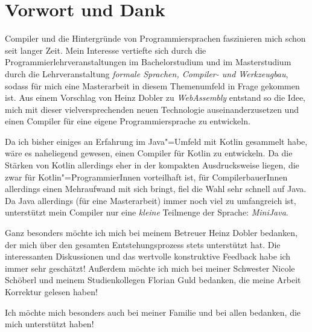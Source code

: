 \chapter{Vorwort und Dank}
 
Compiler und die Hintergründe von Programmiersprachen faszinieren mich schon seit langer Zeit. Mein Interesse vertiefte sich durch die Programmierlehrveranstaltungen im Bachelorstudium und im Masterstudium durch die Lehrveranstaltung \emph{formale Sprachen, Compiler- und Werkzeugbau}, sodass für mich eine Masterarbeit in diesem Themenumfeld in Frage gekommen ist. Aus einem Vorschlag von Heinz Dobler zu \emph{WebAssembly} entstand so die Idee, mich mit dieser vielversprechenden neuen Technologie auseinanderzusetzen und einen Compiler für eine eigene Programmiersprache zu entwickeln.

Da ich bisher einiges an Erfahrung im Java"=Umfeld mit Kotlin gesammelt habe, wäre es naheliegend gewesen, einen Compiler für Kotlin zu entwickeln. Da die Stärken von Kotlin allerdings eher in der kompakten Ausdrucksweise liegen, die zwar für Kotlin"=ProgrammierInnen vorteilhaft ist, für CompilerbauerInnen allerdings einen Mehraufwand mit sich bringt, fiel die Wahl sehr schnell auf Java. Da Java allerdings (für eine Masterarbeit) immer noch viel zu umfangreich ist, unterstützt mein Compiler nur eine \emph{kleine} Teilmenge der Sprache: \emph{MiniJava}.

Ganz besonders möchte ich mich bei meinem Betreuer Heinz Dobler bedanken, der mich über den gesamten Entstehungsprozess stets unterstützt hat. Die interessanten Diskussionen und das wertvolle konstruktive Feedback habe ich immer sehr geschätzt! Außerdem möchte ich mich bei meiner Schwester Nicole Schöberl und meinem Studienkollegen Florian Guld bedanken, die meine Arbeit Korrektur gelesen haben!

Ich möchte mich besonders auch bei meiner Familie und bei allen bedanken, die mich unterstützt haben!
